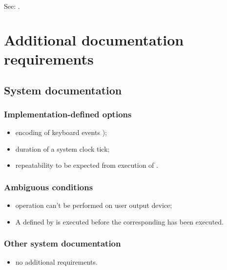 See: .


\section{Additional documentation requirements} %

\subsection{System documentation} %

\subsubsection{Implementation-defined options} %

\begin{itemize}
\item encoding of keyboard events );
\item duration of a system clock tick;
\item repeatability to be expected from execution of
	.
\end{itemize}

\subsubsection{Ambiguous conditions} %

\begin{itemize}
\item {} operation can't be performed on
	user output device;

\item A  defined by
	is executed before the corresponding \linebreak
	has been executed.
\end{itemize}

\subsubsection{Other system documentation} %

\begin{itemize}
\item no additional requirements.
\end{itemize}


